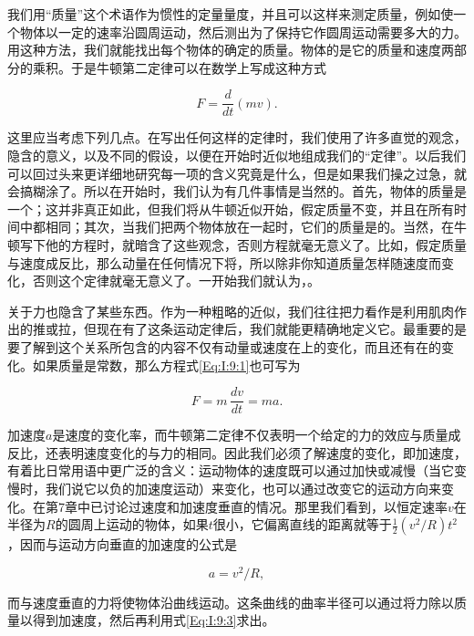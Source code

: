 \documentclass[12pt,oneside]{book}
\providecommand{\ddt}[2]{\frac{d#1}{d#2}}
\begin{document}
我们用“质量”这个术语作为惯性的定量量度，并且可以这样来测定质量，例如使一个物体以一定的速率沿圆周运动，然后测出为了保持它作圆周运动需要多大的力。用这种方法，我们就能找出每个物体的确定的质量。物体的是它的质量和速度两部分的乘积。于是牛顿第二定律可以在数学上写成这种方式

\begin{equation}
\label{Eq:I:9:1}
F=\ddt{}{t}(mv).
\end{equation}

这里应当考虑下列几点。在写出任何这样的定律时，我们使用了许多直觉的观念，隐含的意义，以及不同的假设，以便在开始时近似地组成我们的“定律”。以后我们可以回过头来更详细地研究每一项的含义究竟是什么，但是如果我们操之过急，就会搞糊涂了。所以在开始时，我们认为有几件事情是当然的。首先，物体的质量是一个；这并非真正如此，但我们将从牛顿近似开始，假定质量不变，并且在所有时间中都相同；其次，当我们把两个物体放在一起时，它们的质量是的。当然，在牛顿写下他的方程时，就暗含了这些观念，否则方程就毫无意义了。比如，假定质量与速度成反比，那么动量在任何情况下将，所以除非你知道质量怎样随速度而变化，否则这个定律就毫无意义了。一开始我们就认为，。

关于力也隐含了某些东西。作为一种粗略的近似，我们往往把力看作是利用肌肉作出的推或拉，但现在有了这条运动定律后，我们就能更精确地定义它。最重要的是要了解到这个关系所包含的内容不仅有动量或速度在上的变化，而且还有在的变化。如果质量是常数，那么方程式\eqref{Eq:I:9:1}也可写为

\begin{equation}
\label{Eq:I:9:2}
F=m\,\ddt{v}{t}=ma.
\end{equation}

加速度$a$是速度的变化率，而牛顿第二定律不仅表明一个给定的力的效应与质量成反比，还表明速度变化的与力的相同。因此我们必须了解速度的变化，即加速度，有着比日常用语中更广泛的含义：运动物体的速度既可以通过加快或减慢（当它变慢时，我们说它以负的加速度运动）来变化，也可以通过改变它的运动方向来变化。在第7章中已讨论过速度和加速度垂直的情况。那里我们看到，以恒定速率$ v $在半径为$ R $的圆周上运动的物体，如果$ t $很小，它偏离直线的距离就等于$ \tfrac{1}{2}(v^2/R)t^2 $，因而与运动方向垂直的加速度的公式是

\begin{equation}
\label{Eq:I:9:3}
a=v^2/R,
\end{equation}

而与速度垂直的力将使物体沿曲线运动。这条曲线的曲率半径可以通过将力除以质量以得到加速度，然后再利用式\eqref{Eq:I:9:3}求出。
\end{document}
